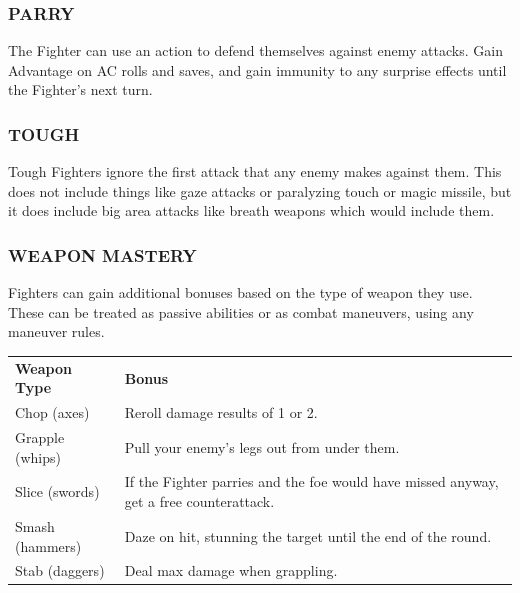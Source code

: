 \documentclass[twoside]{article}
\begin{document}
\subsubsection*{\footnotesize{P}\scriptsize{ARRY}\normalsize}

The Fighter can use an action to defend themselves against enemy attacks. Gain Advantage on AC rolls and saves, and gain immunity to any surprise effects until the Fighter's next turn.

\subsubsection*{\footnotesize{T}\scriptsize{OUGH}\normalsize}

Tough Fighters ignore the first attack that any enemy makes against them. This does not include things like gaze attacks or paralyzing touch or magic missile, but it does include big area attacks like breath weapons which would include them.

\subsubsection*{\footnotesize{W}\scriptsize{EAPON} \footnotesize{M}\scriptsize{ASTERY}\normalsize}

Fighters can gain additional bonuses based on the type of weapon they use. These can be treated as passive abilities or as combat maneuvers, using any maneuver rules.

\bigbreak

\begin{center}
\noindent\begin{tabular}{>{\centering\arraybackslash}p{}p{}}
\textbf{Weapon Type}&\textbf{Bonus}\\
\rowcolor[gray]{0.75}Chop (axes)&Reroll damage results of 1 or 2.\\
Grapple (whips)&Pull your enemy’s legs out from under them.\\
\rowcolor[gray]{0.75}Slice (swords)&If the Fighter parries and the foe would have missed anyway, get a free counterattack.\\
Smash (hammers)&Daze on hit, stunning the target until the end of the round.\\
\rowcolor[gray]{0.75}Stab (daggers)&Deal max damage when grappling.\\
\end{tabular}
\end{center}
\end{document}
